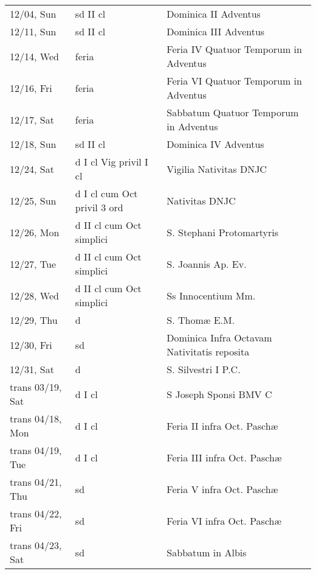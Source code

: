 \documentclass{article}
\begin{document}
\begin{longtable}{ l l l }
12/04, Sun & sd II cl & Dominica II Adventus\\
12/11, Sun & sd II cl & Dominica III Adventus\\
12/14, Wed & feria & Feria IV Quatuor Temporum in Adventus\\
12/16, Fri & feria & Feria VI Quatuor Temporum in Adventus\\
12/17, Sat & feria & Sabbatum Quatuor Temporum in Adventus\\
12/18, Sun & sd II cl & Dominica IV Adventus\\
12/24, Sat & d I cl Vig privil I cl & Vigilia Nativitas DNJC\\
12/25, Sun & d I cl cum Oct privil 3 ord & Nativitas DNJC\\
12/26, Mon & d II cl cum Oct simplici & S. Stephani Protomartyris\\
12/27, Tue & d II cl cum Oct simplici & S. Joannis Ap. Ev.\\
12/28, Wed & d II cl cum Oct simplici & Ss Innocentium Mm.\\
12/29, Thu & d & S. Thomæ E.M.\\
12/30, Fri & sd & Dominica Infra Octavam Nativitatis reposita\\
12/31, Sat & d & S. Silvestri I P.C.\\
trans 03/19, Sat & d I cl & S Joseph Sponsi BMV C\\
trans 04/18, Mon & d I cl & Feria II infra Oct. Paschæ\\
trans 04/19, Tue & d I cl & Feria III infra Oct. Paschæ\\
trans 04/21, Thu & sd & Feria V infra Oct. Paschæ\\
trans 04/22, Fri & sd & Feria VI infra Oct. Paschæ\\
trans 04/23, Sat & sd & Sabbatum in Albis\\
\end{longtable}
\end{document}
